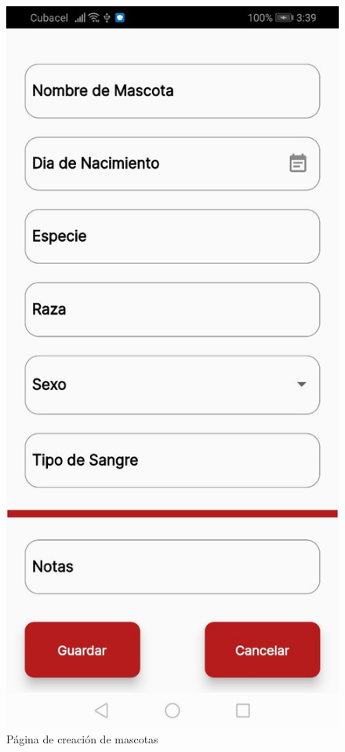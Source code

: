 \begin{figure}[h!]
\begin{center}
\includegraphics[scale=0.15]{Graphics/images/hcvet/addpet.jpg}
\caption{ Página de creación de mascotas}
\label{fig:bac}

\end{center}
\end{figure}

